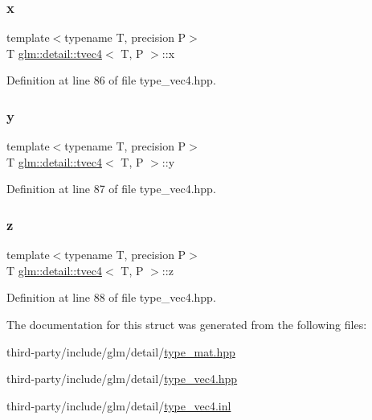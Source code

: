 \mbox{\label{structglm_1_1detail_1_1tvec4_a432497fdfcbcf5ccd75b822cdebafe6b}} 
\subsubsection{\texorpdfstring{x}{x}}
{\footnotesize\ttfamily template$<$typename T, precision P$>$ \\
T \hyperlink{structglm_1_1detail_1_1tvec4}{glm\+::detail\+::tvec4}$<$ T, P $>$\+::x}



Definition at line 86 of file type\+\_\+vec4.\+hpp.

\mbox{\label{structglm_1_1detail_1_1tvec4_a693e41210b49a742eb6c1fd0eb8acb3a}} 
\subsubsection{\texorpdfstring{y}{y}}
{\footnotesize\ttfamily template$<$typename T, precision P$>$ \\
T \hyperlink{structglm_1_1detail_1_1tvec4}{glm\+::detail\+::tvec4}$<$ T, P $>$\+::y}



Definition at line 87 of file type\+\_\+vec4.\+hpp.

\mbox{\label{structglm_1_1detail_1_1tvec4_a382ff89e1d0594bd8366d532b4e3c28a}} 
\subsubsection{\texorpdfstring{z}{z}}
{\footnotesize\ttfamily template$<$typename T, precision P$>$ \\
T \hyperlink{structglm_1_1detail_1_1tvec4}{glm\+::detail\+::tvec4}$<$ T, P $>$\+::z}



Definition at line 88 of file type\+\_\+vec4.\+hpp.



The documentation for this struct was generated from the following files\+:\begin{DoxyCompactItemize}
\item 
third-\/party/include/glm/detail/\hyperlink{type__mat_8hpp}{type\+\_\+mat.\+hpp}\item 
third-\/party/include/glm/detail/\hyperlink{type__vec4_8hpp}{type\+\_\+vec4.\+hpp}\item 
third-\/party/include/glm/detail/\hyperlink{type__vec4_8inl}{type\+\_\+vec4.\+inl}\end{DoxyCompactItemize}
